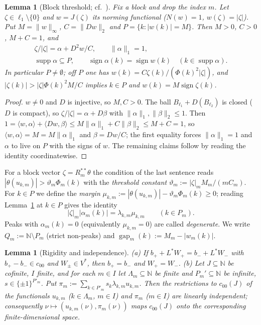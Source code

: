 \documentclass[10pt]{amsart}
\newtheorem{lemma}[theorem]{Lemma}
\theoremstyle{definition}
\theoremstyle{remark}
\newcommand{\supp}{\operatorname{supp}}
\newcommand{\sgn}{\operatorname{sign}}
\newcommand{\N}{\mathbb N}
\newcommand{\gap}{\operatorname{gap}}
\newcommand{\ip}[2]{\langle #1,#2\rangle}
\begin{document}
\begin{lemma}[Block threshold; cf.\ {\cite[Lemma~6.5]{PrB}}]\label{lem:threshold}
Fix a block and drop the index $m$.  Let $\zeta\in\ell_1\setminus\{0\}$ and
$w=J(\zeta)$ its norming functional ($N(w)=1$, $w(\zeta)=|\zeta|$).  Put
$M=\|w\|_\infty$, $C=\|Dw\|_2$ and $P=\{k:|w(k)|=M\}$.  Then $M>0$, $C>0$,
$M+C=1$, and
\begin{gather*}
 \zeta/|\zeta|=\alpha+D^2w/C,\qquad \|\alpha\|_1=1,\\
 \supp\alpha\subseteq P,\qquad \sgn\alpha(k)=\sgn w(k)\quad(k\in\supp\alpha).
\end{gather*}
In particular $P\ne\emptyset$; off $P$ one has
$w(k)=C\zeta(k)/(\Phi(k)^2|\zeta|)$, and $|\zeta(k)|>|\zeta|\Phi(k)^2M/C$
implies $k\in P$ and $w(k)=M\sgn\zeta(k)$.
\end{lemma}

\begin{proof}
$w\neq0$ and $D$ is injective, so $M,C>0$.  The ball
$B_{\ell_1}+D(B_{\ell_2})$ is closed ($D$ is compact), so
$\zeta/|\zeta|=\alpha+D\beta$ with $\|\alpha\|_1,\|\beta\|_2\le1$.  Then
$1=\ip{w}{\alpha}+\ip{Dw}{\beta}\le M\|\alpha\|_1+C\|\beta\|_2\le M+C=1$,
so $\ip{w}{\alpha}=M=M\|\alpha\|_1$ and $\beta=Dw/C$; the first equality
forces $\|\alpha\|_1=1$ and $\alpha$ to live on $P$ with the signs of $w$.
The remaining claims follow by reading the identity coordinatewise.
\end{proof}

For a block vector $\zeta=R_m^{**}\theta$ the condition of the last
sentence reads $|\theta(u_{k,m})|>\vartheta_m\Phi_m(k)$ with the
\emph{threshold constant} $\vartheta_m:=|\zeta|_mM_m/(mC_m)$.  For $k\in P$
we define the \emph{margin}
$\mu_{k,m}:=|\theta(u_{k,m})|-\vartheta_m\Phi_m(k)\ge0$; reading
Lemma~\ref{lem:threshold} at $k\in P$ gives the identity
\begin{equation}\label{eq:margin}
 |\zeta|_m|\alpha_m(k)|=\lambda_{k,m}\mu_{k,m}\qquad(k\in P_m).
\end{equation}
Peaks with $\alpha_m(k)=0$ (equivalently $\mu_{k,m}=0$) are called
\emph{degenerate}.  We write $Q_m:=\N\setminus P_m$ (strict non-peaks) and
$\gap_m(k):=M_m-|w_m(k)|$.

\begin{lemma}[Rigidity and independence]\label{lem:rigidity}
\textup{(a)} If $b_++L^*W_+=b_-+L^*W_-$ with $b_+-b_-\in c_{00}$ and
$W_\pm\in V^*$, then $b_+=b_-$ and $W_+=W_-$.
\textup{(b)} Let $J\subseteq\N$ be cofinite, $I$ finite, and for each
$m\in I$ let $\Lambda_m\subseteq\N$ be finite and $P_m'\subseteq\N$ be
infinite, $s\in\{\pm1\}^{P'_m}$.  Put
$\pi_m:=\sum_{k\in P'_m}s_k\lambda_{k,m}u_{k,m}$.  Then the restrictions to
$c_{00}(J)$ of the functionals $u_{k,m}$ \textup{(}$k\in\Lambda_m$,
$m\in I$\textup{)} and $\pi_m$ \textup{(}$m\in I$\textup{)} are linearly
independent; consequently $\nu\mapsto(u_{k,m}(\nu),\pi_m(\nu))$ maps
$c_{00}(J)$ onto the corresponding finite-dimensional space.
\end{lemma}
\end{document}
